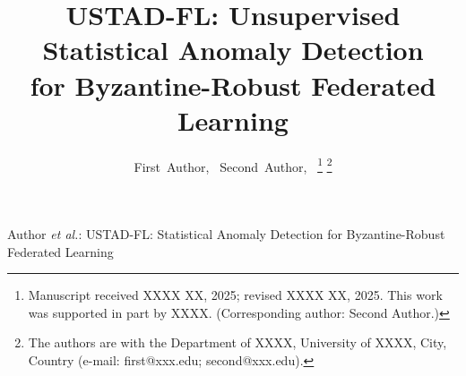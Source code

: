 \documentclass[journal]{IEEEtran}
\begin{document}
\title{USTAD-FL: Unsupervised Statistical Anomaly Detection\\for Byzantine-Robust Federated Learning}

\author{First~Author,~
Second~Author,~
\thanks{Manuscript received XXXX XX, 2025; revised XXXX XX, 2025. This work was supported in part by XXXX. (Corresponding author: Second Author.)}
\thanks{The authors are with the Department of XXXX, University of XXXX, City, Country (e-mail: first@xxx.edu; second@xxx.edu).}}

{Author \MakeLowercase{\textit{et al.}}: USTAD-FL: Statistical Anomaly Detection for Byzantine-Robust Federated Learning}

\maketitle
\end{document}
